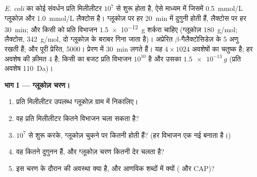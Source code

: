 \begin{problem}
\label{pb:b1:expression-control:1}
\emph{E. coli} का कोई संवर्धन प्रति मिलीलीटर $10^7$  से शुरू
होता है, ऐसे माध्यम में जिसमें \qty{0.5}{mmol/L} ग्लूकोज़ और
\qty{1.0}{mmol/L} लैक्टोस है। ग्लूकोज़ पर  हर \qty{20}{min} में
दुगुनी होती हैं, लैक्टोस पर हर \qty{30}{min}; और किसी  को प्रति
विभाजन \qty{1.5e-12}{g} शर्करा चाहिए (ग्लूकोज़ \qty{180}{g/mol};
लैक्टोस, \qty{342}{g/mol}, दो ग्लूकोज़ के बराबर गिना जाता है)।
अप्रेरित  $\beta$-गैलैक्टोसिडेज़ के 5 अणु रखती हैं; और पूरी
प्रेरित, \num{5000}। प्रेरण में \qty{30}{min} लगते हैं।
यह  $4\times 1024$ अवशेषों का चतुष्क है; हर अवशेष की क़ीमत 4 
है; किसी  का  बजट प्रति विभाजन $10^{10}$ है और उसका 
$\qty{1.5e-13}{g}$ (प्रति अवशेष \qty{110}{Da})।

\medskip
\noindent\textbf{भाग I --- ग्लूकोज़ चरण।}
\begin{enumerate}
  \item प्रति मिलीलीटर उपलब्ध ग्लूकोज़ ग्राम में निकालिए।
  \item वह प्रति मिलीलीटर कितने विभाजन चला सकता है?
  \item $10^7$  से शुरू करके, ग्लूकोज़ चुकने पर कितनी 
        होती हैं? (हर विभाजन एक नई  बनाता है।)
  \item वह कितने दुगुनन हैं, और ग्लूकोज़ चरण कितनी देर चलता है?
  \item इस चरण के दौरान  की अवस्था क्या है, और आणविक शब्दों
        में क्यों ( और CAP)?
\end{enumerate}


\end{problem}
